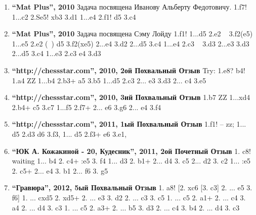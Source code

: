 \begin{enumerate}
\item \textbf{ ``Mat Plus'', 2010} Задача посвящена Иванову Альберту Федотовичу. 1.\knight{}f7! 
  1...\king{}c2 2.Se5! \king{}xb3 3.\queen{}d1\mate{}
  1...\king{}e4 2.\queen{}f1! \king{}d5 3.\queen{}c4\mate{}

\item \textbf{ ``Mat Plus'', 2010} Задача посвящена Сэму Лойду 1.\queen{}f1!
  1...d5 2.\queen{}e2 ~ 3.\bishop{}f2(\bishop{}e5)\mate{}
  1...e5 2.\queen{}e2 (~) d5 3.\bishop{}f2(\bishop{}xe5)\mate{}
      2...e4 3.\queen{}d2\mate{}
      2...\king{}d5 3.\queen{}c4\mate{}
  1...\king{}e4 2.\king{}c3 ~ 3.\queen{}d3\mate{}
      2...\king{}e3 3.\queen{}d3\mate{}
      2...\king{}d5 3.\queen{}c4\mate{}
  1...\king{}e3 2.\king{}c3 \king{}e4 3.\queen{}d3\mate{}

\item \textbf{ ``http://chessstar.com'', 2010, 2ой Похвальный Отзыв } Try: 1.\bishop{}e8? \king{}b4!
1.\bishop{}a4 ZZ 
  1...\king{}b4 2.\queen{}b3+ \king{}a5 3.\queen{}b5\mate{}
  1...\king{}d5 2.\queen{}c3 
    2... e3 3.\queen{}d3\mate{} 
    2... c4 3.\queen{}e5\mate{}

\item \textbf{ ``http://chessstar.com'', 2010, 3ий Похвальный Отзыв } 1.\rook{}b7 ZZ 
  1...\king{}xd4 2.\rook{}b4+ \king{}c5 3.\queen{}c7\mate{}
  1...\king{}f5 2.\rook{}f7+ 
    2... \king{}e6 3.\queen{}g6\mate{} 
    2... \king{}e4 3.\rook{}f4\mate{}

\item \textbf{ ``http://chessstar.com'', 2011, 1ый Похвальный Отзыв} 1.\queen{}f1! – zz;
  1... d5 2.\rook{}d3 d6 3.\queen{}f3\mate{},
  1... \king{}d5 2.\queen{}f3+ \king{}e6 3.\rook{}e1\mate{},

\item \textbf{ ``ЮК А. Кожакиной - 20, Кудесник'', 2011, 2ой Почетный Отзыв } 1. \queen{}c8! waiting
1... b4 2. \queen{}c4+ \king{}:e5 3. \queen{}f4\mate{}
1... \king{}d3 2. \bishop{}b1+
  2... \king{}d4 3. \queen{}c5\mate{}
  2... \king{}d2 3. \queen{}c2\mate{}
1... \king{}:e5 2. \queen{}c5+
  2... \king{}e4 3. \bishop{}b1\mate{}
  2... \king{}f6 3. \queen{}g5\mate{}

\item \textbf{ ``Гравюра'', 2012, 5ый Похвальный Отзыв } 1. \queen{}a8! [2. \queen{}xc6 [3. \queen{}c3\mate{}]
  2. ... \king{}e5 3. \queen{}f6\mate{}]
1. ... cxd5 2. \queen{}xd5+
  2. ... \king{}e3 3. \queen{}d2\mate{}
  2. ... \king{}c3 3. \queen{}c5\mate{}
1. ... c5 2. \queen{}a1+
  2. ... \king{}c4 3. \queen{}a4\mate{}
   2. ... \king{}d4 3. \queen{}c3\mate{}
1. ... \king{}c5 2. \queen{}a3+
  2. ... \king{}b5 3. \bishop{}d3\mate{}
  2. ... \king{}c4 3. \queen{}b4\mate{}
  2. ... \king{}d4 3. \queen{}c3\mate{}


\end{enumerate}
